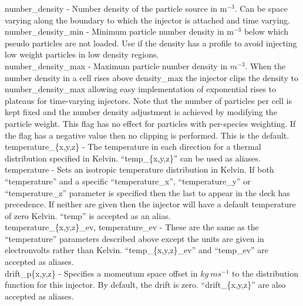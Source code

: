 {\emphtext number\_density} - Number density of the particle source in
  m$^{-3}$. Can be space varying along the boundary to which the injector is
  attached and time varying.\\

{\emphtext number\_density\_min} - Minimum particle number density in m$^{-3}$
  below which pseudo particles are not loaded. Use if the density has a profile
  to avoid injecting low weight particles in low density regions.\\

{\emphtext number\_density\_max} - Maximum particle number density in $m^{-3}$.
  When the number density in a cell rises above density\_max the
  injector clips the density to number\_density\_max allowing easy
  implementation of exponential rises to plateaus for time-varying injectors.
  Note that the number of particles per cell is kept fixed and the number
  density adjustment is achieved by modifying the particle weight. This flag
  has no effect for particles with per-species weighting.
  If the flag has a negative value then no clipping is performed. This is the
  default.\\

{\emphtext temperature\_\{x,y,z\}} - The temperature in each direction for a
  thermal distribution specified in Kelvin. ``temp\_\{x,y,z\}'' can be used as
  aliases.\\

{\emphtext temperature} - Sets an isotropic temperature distribution in Kelvin.
  If both ``temperature'' and a specific ``temperature\_x'', ``temperature\_y''
  or ``temperature\_z'' parameter is specified then the last to appear in the
  deck has precedence. If neither are given then the injector will have a
  default temperature of zero Kelvin. ``temp'' is accepted as an alias.\\

{\emphtext temperature\_\{x,y,z\}\_ev, temperature\_ev} - These are the same
  as the ``temperature'' parameters described above except the units are given
  in electronvolts rather than Kelvin. ``temp\_\{x,y,z\}\_ev'' and ``temp\_ev''
  are accepted as aliases.\\

{\emphtext drift\_p\{x,y,z\}} - Specifies a momentum space offset in
  $kg\ ms^{-1}$ to the distribution function for this injector. By default,
  the drift is zero. ``drift\_\{x,y,z\}'' are also accepted as aliases.\\

